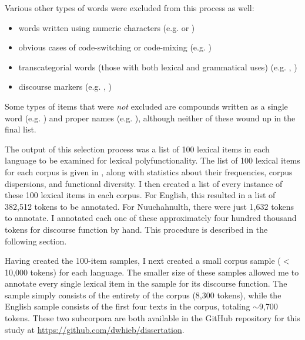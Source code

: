 Various other types of words were excluded from this process as well:

\begin{itemize}

  \singlespacing

  \item words written using numeric characters (e.g.  or )

  \item obvious cases of code-switching or code-mixing (e.g.  )

  \item transcategorial words (those with both lexical and grammatical uses) (e.g. , )

  \item discourse markers (e.g. , )

\end{itemize}

\noindent Some types of items that were \emph{not} excluded are compounds written as a single word (e.g. ) and proper names (e.g. ), although neither of these wound up in the final list.

The output of this selection process was a list of 100 lexical items in each language to be examined for lexical polyfunctionality. The list of 100 lexical items for each corpus is given in , along with statistics about their frequencies, corpus dispersions, and functional diversity. I then created a list of every instance of these 100 lexical items in each corpus. For English, this resulted in a list of 382,512 tokens to be annotated. For Nuuchahnulth, there were just 1,632 tokens to annotate. I annotated each one of these approximately four hundred thousand tokens for discourse function by hand. This procedure is described in the following section.

Having created the 100-item samples, I next created a small corpus sample ($<$10,000 tokens) for each language. The smaller size of these samples allowed me to annotate every single lexical item in the sample for its discourse function. The  sample simply consists of the entirety of the corpus (8,300 tokens), while the English sample consists of the first four texts in the corpus, totaling $\sim$9,700 tokens. These two subcorpora are both available in the GitHub repository for this study at \url{https://github.com/dwhieb/dissertation}.

